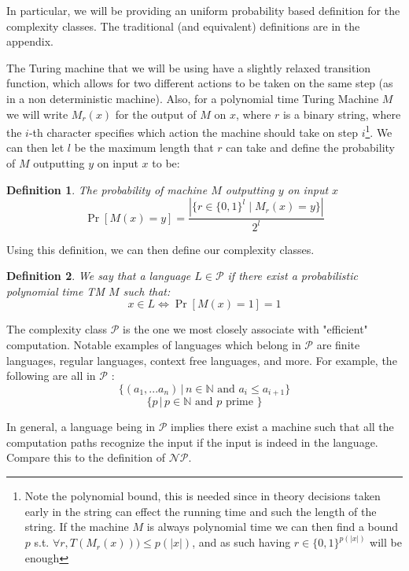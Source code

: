 \documentclass{article}
\newtheorem{definition}{Definition}
\begin{document}
In particular, we will be providing an uniform probability based definition for the complexity classes. The traditional (and equivalent) definitions are in the appendix.

The Turing machine that we will be using have a slightly relaxed transition function, which allows for two different actions to be taken on the same step (as in a non deterministic machine). Also, for a polynomial time Turing Machine $M$ we will write $M_r(x)$ for the output of $M$ on $x$, where $r$ is a binary string, where the $i$-th character specifies which action the machine should take on step $i$\footnote{Note the polynomial bound, this is needed since in theory decisions taken early in the string can effect the running time and such the length of the string. If the machine $M$ is always polynomial time we can then find a bound $p$ s.t. $\forall r, T(M_r(x))) \leq p(|x|) $, and as such having $r \in \{0,1\}^{p(|x|)}$ will be enough}. We can then let $l$ be the maximum length that $r$ can take and define the probability of $M$ outputting $y$ on input $x$ to be:

\begin{definition} The probability of machine $M$ outputting $y$ on input $x$
\[ \Pr[M(x) = y] = \frac{|\{r \in \{0, 1\}^{l} \mid M_r(x) = y \}|}{2^{l}}\]
\end{definition}

Using this definition, we can then define our complexity classes. 

\begin{definition}
We say that a language $L \in \mathcal{P}$ if there exist a probabilistic polynomial time TM $M$ such that:
\[x \in L \iff \Pr[M(x) = 1] = 1\]
\end{definition}

The complexity class $\mathcal{P}$ is the one we most closely associate with "efficient" computation. Notable examples of languages which belong in $\mathcal{P}$ are finite languages, regular languages, context free languages, and more. For example, the following are all in $\mathcal{P}$ : 
\[ \{(a_1, ... a_n) \, | \, n \in \mathbb{N} \text{ and } a_i \leq a_{i+1} \}\]
\[ \{ p \,|\, p \in \mathbb{N} \text{ and } p \text{ prime } \}\]

In general, a language being in $\mathcal{P}$ implies there exist a machine such that all the computation paths recognize the input if the input is indeed in the language. \\

Compare this to the definition of $\mathcal{NP}$.
\end{document}
